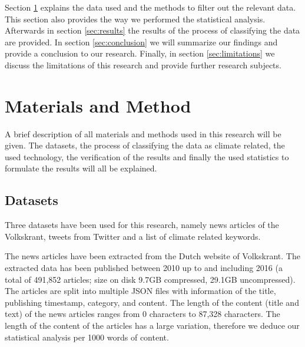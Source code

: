 \documentclass[paper=a4, fontsize=9px]{scrartcl} %
\numberwithin{equation}{section} %
\numberwithin{figure}{section} %
\numberwithin{table}{section} %
\begin{document}
\begin{multicols}{2}
Section \ref{sec:method} explains the data used and the methods to filter out the relevant data. This section also provides the way we performed the statistical analysis.
Afterwards in section \ref{sec:results} the results of the process of classifying the data are provided. In section \ref{sec:conclusion} we will summarize our findings and provide a conclusion to our research. Finally, in section \ref{sec:limitations} we discuss the limitations of this research and provide further research subjects.


\section{Materials and Method}\label{sec:method}

A brief description of all materials and methods used in this research will be given. The datasets, the process of classifying the data as climate related, the used technology, the verification of the results and finally the used statistics to formulate the results will all be explained.


\subsection{Datasets}

Three datasets have been used for this research, namely news articles of the Volkskrant, tweets from Twitter and a list of climate related keywords.

The news articles have been extracted from the Dutch website of Volkskrant. The extracted data has been published between 2010 up to and including 2016 (a total of 491,852 articles; size on disk 9.7GB compressed, 29.1GB uncompressed). The articles are split into multiple JSON files with information of the title, publishing timestamp, category, and content. The length of the content (title and text) of the news articles ranges from 0 characters to 87,328 characters. The length of the content of the articles has a large variation, therefore we deduce our statistical analysis per 1000 words of content.


\end{multicols}
\end{document}
